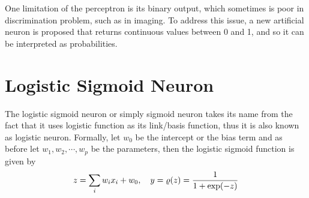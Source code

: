 One limitation of the perceptron is its binary output, which sometimes is poor in discrimination problem, such as in imaging. To address this issue, a new artificial neuron is proposed that returns continuous values between 0 and 1, and so it can be interpreted as probabilities.

\section{Logistic Sigmoid Neuron}\label{sec:sln}
The logistic sigmoid neuron or simply sigmoid neuron takes its name from the fact that it uses logistic function as its link/basis function, thus it is also known as logistic neuron. Formally, let $w_0$ be the intercept or the bias term and as before let $w_1,w_2,\cdots,w_p$ be the parameters, then the logistic sigmoid function is given by
\begin{equation}\label{eq:logsig}
z=\sum_{i}w_ix_i+w_0,\quad y=\varrho(z)=\frac{1}{1+\exp(-z)}
\end{equation}

